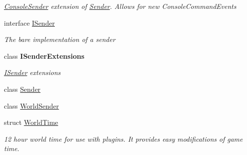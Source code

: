 \begin{DoxyCompactItemize}
\begin{DoxyCompactList}\small\item\em \hyperlink{class_o_t_a_1_1_command_1_1_console_sender}{Console\+Sender} extension of \hyperlink{class_o_t_a_1_1_command_1_1_sender}{Sender}. Allows for new Console\+Command\+Events \end{DoxyCompactList}\item 
interface \hyperlink{interface_o_t_a_1_1_command_1_1_i_sender}{I\+Sender}
\begin{DoxyCompactList}\small\item\em The bare implementation of a sender \end{DoxyCompactList}\item 
class {\bfseries I\+Sender\+Extensions}
\begin{DoxyCompactList}\small\item\em \hyperlink{interface_o_t_a_1_1_command_1_1_i_sender}{I\+Sender} extensions \end{DoxyCompactList}\item 
class \hyperlink{class_o_t_a_1_1_command_1_1_sender}{Sender}
\item 
class \hyperlink{class_o_t_a_1_1_command_1_1_world_sender}{World\+Sender}
\item 
struct \hyperlink{struct_o_t_a_1_1_command_1_1_world_time}{World\+Time}
\begin{DoxyCompactList}\small\item\em 12 hour world time for use with plugins. It provides easy modifications of game time. \end{DoxyCompactList}\end{DoxyCompactItemize}
